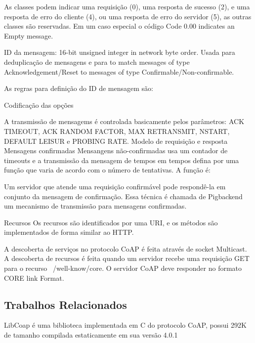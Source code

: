    As classes podem indicar uma requisi\c{c}\~ao (0), uma resposta de sucesso (2), e uma resposta de erro do cliente (4), ou uma resposta de erro do servidor (5), as outras classes s\~ao reservadas. Em um caso especial o c\'odigo Code 0.00 indicates an Empty message.

   ID da mensagem:  16-bit unsigned integer in network byte order. Usada para deduplica\c{c}\~ao de mensagens e para to match messages of type Acknowledgement/Reset to messages of type Confirmable/Non-confirmable.

    As regras para defini\c{c}\~ao do ID de mensagem s\~ao:
   
Codifica\c{c}\~ao das op\c{c}\~oes

A transmiss\~ao de mensagems \'e controlada basicamente pelos par\^ametros: ACK TIMEOUT, ACK RANDOM FACTOR, MAX RETRANSMIT, NSTART, DEFAULT LEISUR e PROBING RATE.
Modelo de requisi\c{c}\~ao e resposta Mensagens confirmadas Mensangens n\~ao-confirmadas usa um contador de timeouts e a transmiss\~ao da mensagem de tempos em tempos defina por uma fun\c{c}\~ao que varia de acordo com o n\'umero de tentativas.
A fun\c{c}\~ao \'e:

Um servidor que atende uma requisi\c{c}\~ao confirm\'avel pode respondê-la em conjunto da mensagem de confirma\c{c}\~ao. Essa t\'ecnica \'e chamada de Pigbackend um mecanismo de transmiss\~ao para mensagens confirmadas.\cite{draft-ietf-core-coap-18}

Recursos
Os recursos s\~ao identificados por uma URI, e os m\'etodos s\~ao implementados de forma similar ao HTTP.

A descoberta de servi\c{c}os no protocolo CoAP \'e feita atrav\'es de socket Multicast.
A descoberta de recursos \'e feita quando um servidor recebe uma requisi\c{c}\~ao GET para o recurso ~/well-know/core. O servidor CoAP deve responder no formato CORE link Format.\cite{rfc6690}

\subsection{Trabalhos Relacionados}

LibCoap \'e uma biblioteca implementada em C do protocolo CoAP, possui 292K de tamanho compilada estaticamente em sua vers\~ao 4.0.1

